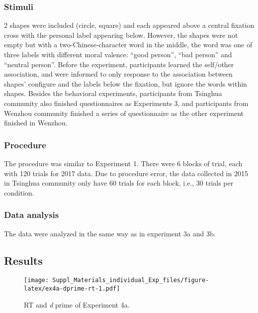\documentclass[man]{apa6}
\begin{document}
\hypertarget{stimuli-1}{%
\subsubsection{Stimuli}\label{stimuli-1}}

2 shapes were included (circle, square) and each appeared above a central fixation cross with the personal label appearing below. However, the shapes were not empty but with a two-Chinese-character word in the middle, the word was one of three labels with different moral valence: \enquote{good person}, \enquote{bad person} and \enquote{neutral person}. Before the experiment, participants learned the self/other association, and were informed to only response to the association between shapes' configure and the labels below the fixation, but ignore the words within shapes. Besides the behavioral experiments, participants from Tsinghua community also finished questionnaires as Experiments 3, and participants from Wenzhou community finished a series of questionnaire as the other experiment finished in Wenzhou.

\hypertarget{procedure-6}{%
\subsubsection{Procedure}\label{procedure-6}}

The procedure was similar to Experiment 1. There were 6 blocks of trial, each with 120 trials for 2017 data. Due to procedure error, the data collected in 2015 in Tsinghua community only have 60 trials for each block, i.e., 30 trials per condition.

\hypertarget{data-analysis-5}{%
\subsubsection{Data analysis}\label{data-analysis-5}}

The data were analyzed in the same way as in experiment 3a and 3b.

\hypertarget{results-6}{%
\subsection{Results}\label{results-6}}

\begin{figure}
\centering
\texttt{[image: Suppl\_Materials\_individual\_Exp\_files/figure-latex/ex4a-dprime-rt-1.pdf]}
\caption{\label{fig:ex4a-dprime-rt}RT and \emph{d} prime of Experiment 4a.}
\end{figure}
\end{document}
